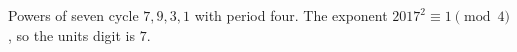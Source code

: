 Powers of seven cycle $7,9,3,1$ with period four. The exponent $2017^2\equiv1\pmod4$, so the units digit is $\boxed7$.
